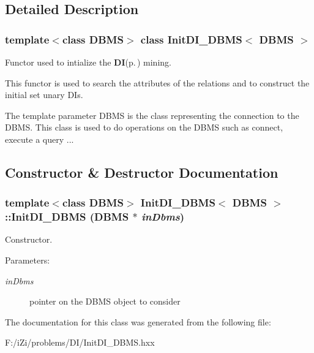 \subsection{Detailed Description}
\subsubsection*{template$<$class DBMS$>$ class Init\-DI\_\-DBMS$<$ DBMS $>$}

Functor used to intialize the {\bf DI}{\rm (p.\,\pageref{class_d_i})} mining. 

This functor is used to search the attributes of the relations and to construct the initial set unary DIs.

The template parameter DBMS is the class representing the connection to the DBMS. This class is used to do operations on the DBMS such as connect, execute a query ... 



\subsection{Constructor \& Destructor Documentation}
\subsubsection{\setlength{\rightskip}{0pt plus 5cm}template$<$class DBMS$>$ {\bf Init\-DI\_\-DBMS}$<$ DBMS $>$::{\bf Init\-DI\_\-DBMS} (DBMS $\ast$ {\em in\-Dbms})\hspace{0.3cm}{\tt  [inline]}}\label{class_init_d_i___d_b_m_s_a750a48a13b374b15676d7f73c8c0bfb}


Constructor. 

\begin{Desc}
\item[Parameters:]
\begin{description}
\item[{\em in\-Dbms}]pointer on the DBMS object to consider \end{description}
\end{Desc}


The documentation for this class was generated from the following file:\begin{CompactItemize}
\item 
F:/i\-Zi/problems/DI/Init\-DI\_\-DBMS.hxx\end{CompactItemize}
